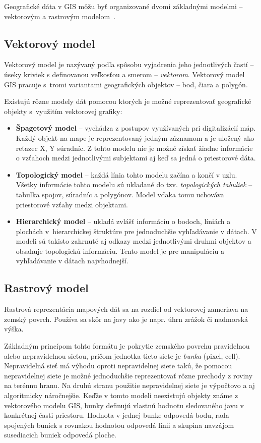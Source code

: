 Geografické dáta v GIS môžu byť organizované dvomi základnými modelmi \--- vektorovým a rastrovým modelom~\cite{holman2014priestorovedata}.

\subsection{Vektorový model}
Vektorový model je nazývaný podľa spôsobu vyjadrenia jeho jednotlivých častí \--- úseky kriviek s definovanou veľkosťou a smerom \--- \emph{vektorom}. Vektorový model GIS pracuje s~tromi variantami geografických objektov \--- bod, čiara a polygón.

Existujú rôzne modely dát pomocou ktorých je možné reprezentovať geografické objekty s~využitím vektorovej grafiky:
\begin{itemize}
    \item \textbf{Špagetový model} \--- vychádza z postupov využívaných pri digitalizácií máp. Každý objekt na mape je reprezentovaný jedným záznamom a je uložený ako reťazec X, Y súradníc. Z tohto modelu nie je možné získať žiadne informácie o vzťahoch medzi jednotlivými subjektami aj keď sa jedná o priestorové dáta.
    \item \textbf{Topologický model} \--- každá línia tohto modelu začína a končí v uzlu. Všetky informácie tohto modelu sú ukladané do tzv. \emph{topologických tabuliek} \--- tabuľka spojov, súradníc a polygónov. Model vďaka tomu uchováva priestorové vzťahy medzi objektami.
    \item \textbf{Hierarchický model} \--- ukladá zvlášť informáciu o bodoch, líniách a plochách v~hierarchickej štruktúre pre jednoduchšie vyhľadávanie v dátach. V modeli sú takisto zahrnuté aj odkazy medzi jednotlivými druhmi objektov a obsahuje topologickú informáciu. Tento model je pre manipuláciu a vyhľadávanie v dátach najvhodnejší.
\end{itemize}

\subsection{Rastrový model}
Rastrová reprezentácia mapových dát sa na rozdiel od vektorovej zameriava na zemský povrch. Používa sa skôr na javy ako je napr. úhrn zrážok či nadmorská výška.

Základným princípom tohto formátu je pokrytie zemského povrchu pravidelnou alebo nepravidelnou sieťou, pričom jednotka tieto siete je \emph{bunka} (pixel, cell). Nepravidelná sieť má výhodu oproti nepravidelnej siete takú, že pomocou nepravidelnej siete je možné jednoduchšie reprezentovať rôzne prechody z roviny na terénnu hranu. Na druhú stranu použitie nepravidelnej siete je výpočtovo a aj algoritmicky náročnejšie. Keďže v tomto modeli neexistujú objekty známe z vektorového modelu GIS, bunky definujú vlastnú hodnotu sledovaného javu v konkrétnej časti priestoru. Hodnota v jednej bunke odpovedá bodu, rada spojených buniek s rovnakou hodnotou odpovedá línii a skupina navzájom susediacich buniek odpovedá ploche.

